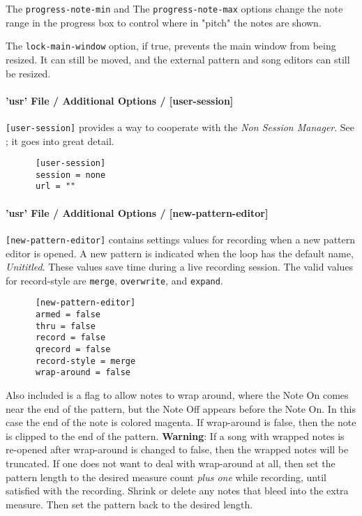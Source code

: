    The \texttt{progress-note-min} and
   The \texttt{progress-note-max} options change the note range in the progress
   box to control where in "pitch" the notes are shown.

   The \texttt{lock-main-window} option, if true, prevents the main window from
   being resized.  It can still be moved, and the external pattern and song
   editors can still be resized.

\paragraph{'usr' File / Additional Options / [user-session]}
\label{paragraph:user_file_added_options_session}

   \texttt{[user-session]} provides a way to cooperate with the
   \textsl{Non Session Manager}.
   See ; it goes into great
   detail.

   \begin{verbatim}
      [user-session]
      session = none
      url = ""
   \end{verbatim}

\paragraph{'usr' File / Additional Options / [new-pattern-editor]}
\label{paragraph:user_file_added_options_pattern_editor}

   \texttt{[new-pattern-editor]} contains settings values for recording
    when a new pattern editor is opened. A new pattern is indicated when
   the loop has the default name, \textsl{Unititled}.
    These values save time during a live recording session.
   The valid values for record-style are \texttt{merge},
    \texttt{overwrite}, and \texttt{expand}.

   \begin{verbatim}
      [new-pattern-editor]
      armed = false
      thru = false
      record = false
      qrecord = false
      record-style = merge
      wrap-around = false
   \end{verbatim}

   Also included is a flag to allow notes to wrap around, where the Note On
   comes near the end of the pattern, but the Note Off appears before the
   Note On.
   In this case the end of the note is colored magenta.
   If wrap-around is false, then the note is clipped to the end of the pattern.
   \textbf{Warning}:
   If a song with wrapped notes is re-opened after wrap-around is changed
   to false, then the wrapped notes will be truncated.
   If one does not want to deal with wrap-around at all, then set the pattern
   length to the desired measure count \textsl{plus one} while recording, until
   satisfied with the recording.  Shrink or delete any notes that bleed into
   the extra measure. Then set the pattern back to the desired length.

